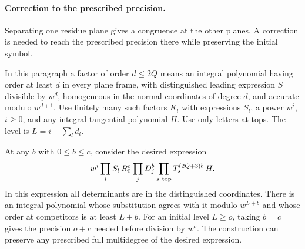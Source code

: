 \paragraph{Correction to the prescribed precision.}

Separating one residue plane gives a congruence at the other planes. A correction is needed to reach the prescribed precision there while preserving the initial symbol.

\begin{lemma}\label{lem:plane-normal-correction}
In this paragraph a factor
of order \(d\le2Q\) means an integral polynomial having order
at least \(d\) in every plane frame, with distinguished leading
expression \(S\) divisible by \(w^d\), homogeneous in the
normal coordinates of degree \(d\), and accurate modulo \(w^{d+1}\).
Use finitely many such factors \(K_l\) with expressions \(S_l\),
a power \(w^i\), \(i\ge0\), and any integral tangential polynomial
\(H\). Use only letters at tops. The level is \(L=i+\sum_l d_l\).

At any \(b\) with \(0\le b\le c\), consider the desired expression
\[
  w^i\prod_l S_l\, R_0^c\prod_jD_j^{b}
                  \prod_{s\ {\rm top}}T_s^{(2Q+3)b}\,H.
\]
In this expression all determinants are in the distinguished
coordinates. There is an integral polynomial whose substitution
agrees with it modulo \(w^{L+b}\) and whose order at competitors
is at least \(L+b\). For an initial level \(L\ge o\), taking
\(b=c\) gives the precision \(o+c\) needed before division by
\(w^o\). The construction can preserve any prescribed full
multidegree of the desired expression.
\end{lemma}

